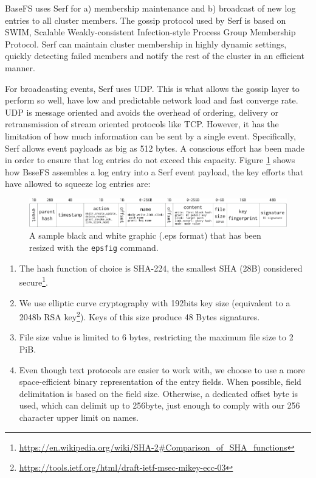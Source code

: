 \documentclass{sig-alternate}
\begin{document}
BaseFS uses Serf for a) membership maintenance and b) broadcast of new log entries to all cluster members. The gossip protocol used by Serf is based on SWIM, Scalable Weakly-consistent Infection-style Process Group Membership Protocol\cite{SWIM}. Serf can maintain cluster membership in highly dynamic settings, quickly detecting failed members and notify the rest of the cluster in an efficient manner.

For broadcasting events, Serf uses UDP. This is what allows the gossip layer to perform so well, have low and predictable network load and fast converge rate. UDP is message oriented and avoids the overhead of ordering, delivery or retransmission of stream oriented protocols like TCP. However, it has the limitation of how much information can be sent by a single event. Specifically, Serf allows event payloads as big as 512 bytes. A conscious effort has been made in order to ensure that log entries do not exceed this capacity. Figure \ref{entrypacket} shows how BsseFS assembles a log entry into a Serf event payload, the key efforts that have allowed to squeeze log entries are: 


\begin{figure}
\centering
\includegraphics[width=\textwidth]{payload.png}
\caption{A sample black and white graphic (.eps format)
that has been resized with the \texttt{epsfig} command.}
\label{entrypacket}
\end{figure}


\begin{enumerate}
\item The hash function of choice is SHA-224, the smallest SHA (28B) considered secure\footnote{\url{https://en.wikipedia.org/wiki/SHA-2\#Comparison\_of\_SHA\_functions}}.
\item We use elliptic curve cryptography with 192bits key size (equivalent to a 2048b RSA key\footnote{\url{https://tools.ietf.org/html/draft-ietf-msec-mikey-ecc-03}}). Keys of this size produce  48 Bytes signatures.
\item File size value is limited to 6 bytes, restricting the maximum file size to 2 PiB.
\item Even though text protocols are easier to work with, we choose to use a more space-efficient binary representation of the entry fields. When possible, field delimitation is based on the field size. Otherwise, a dedicated offset byte is used, which can delimit up to 256byte, just enough to comply with our 256 character upper limit on names.
\end{enumerate}
\end{document}
